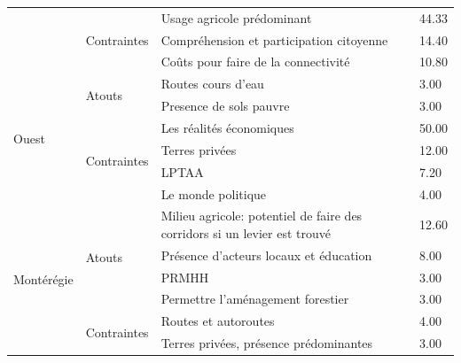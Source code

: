 \begin{table}[h!]
\begin{tabular}{m{}lm{}l}
                       & \multirow{3}{*}{Contraintes} & Usage agricole prédominant                          & 44.33 \\ \cline{3-4} 
                       &                              & Compréhension et participation citoyenne            & 14.40 \\ \cline{3-4} 
                       &                              & Coûts pour faire de la connectivité                 & 10.80 \\ \hline
\multirow{6}{*}{Ouest} & \multirow{2}{*}{Atouts}      & Routes cours d'eau                                  & 3.00  \\ \cline{3-4} 
                       &                              & Presence de sols pauvre                             & 3.00  \\ \cline{2-4} 
                       & \multirow{4}{*}{Contraintes} & Les réalités économiques                            & 50.00 \\ \cline{3-4} 
                       &                              & Terres privées                                      & 12.00 \\ \cline{3-4} 
                       &                              & LPTAA                                               & 7.20  \\ \cline{3-4} 
                       &                              & Le monde politique                                  & 4.00  \\ \hline
\multirow{6}{*}{Montérégie} &
  \multirow{4}{*}{Atouts} &
  Milieu agricole: potentiel de faire des corridors si un levier est trouvé &
  12.60 \\ \cline{3-4} 
                       &                              & Présence d'acteurs locaux et éducation              & 8.00  \\ \cline{3-4} 
                       &                              & PRMHH                                               & 3.00  \\ \cline{3-4} 
                       &                              & Permettre l'aménagement forestier                   & 3.00  \\ \cline{2-4} 
                       & \multirow{2}{*}{Contraintes} & Routes et autoroutes                                & 4.00  \\ \cline{3-4} 
                       &                              & Terres privées, présence prédominantes              & 3.00  \\ \hline
\end{tabular}
\end{table}


